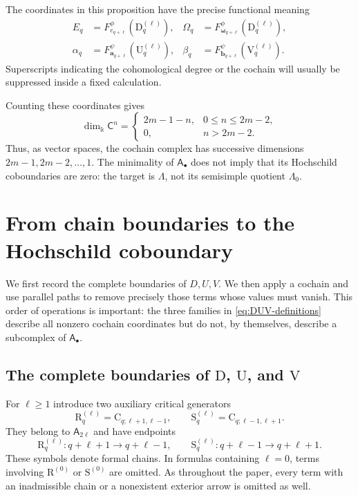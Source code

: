 \documentclass[a4paper,11pt,oneside,reqno]{amsart}
\theoremstyle{definition}
\numberwithin{equation}{section}
\begin{document}
	The coordinates in this proposition have the precise functional meaning
	\begin{equation}\label{eq:coordinate-functionals}
		\begin{aligned}
			E_q&=F_{e_{q+\ell}}^\phi(\mathrm{D}_q^{(\ell)}),&
			\Omega_q&=F_{\boldsymbol{\omega}_{q+\ell}}^\phi(\mathrm{D}_q^{(\ell)}),\\
			\alpha_q&=F_{\mathbf{a}_{q+\ell}}^\psi(\mathrm{U}_q^{(\ell)}),&
			\beta_q&=F_{\mathbf{b}_{q+\ell}}^\psi(\mathrm{V}_q^{(\ell)}).
		\end{aligned}
	\end{equation}
	Superscripts indicating the cohomological degree or the cochain
	will usually be suppressed inside a fixed calculation.
	
	Counting these coordinates gives
	\begin{equation}\label{eq:cochain-dimensions}
		\dim_{\Bbbk}\mathsf C^n=
		\begin{cases}
			2m-1-n,&0\leq n\leq2m-2,\\
			0,&n>2m-2.
		\end{cases}
	\end{equation}
	Thus, as vector spaces, the cochain complex has successive dimensions
	$2m-1,2m-2,\ldots,1$.  The minimality of $\mathsf A_\bullet$ does not imply
	that its Hochschild coboundaries are zero: the target is $\Lambda$,
	not its semisimple quotient $\Lambda_0$.
	
	\section{From chain boundaries to the Hochschild coboundary}
	\label{sec:coboundary}
	
	We first record the complete boundaries of $D,U,V$.  We then apply a
	cochain and use parallel paths to remove precisely those terms whose
	values must vanish.  This order of operations is important: the three
	families in \eqref{eq:DUV-definitions} describe all nonzero cochain
	coordinates but do not, by themselves, describe a subcomplex of
	$\mathsf A_\bullet$.
	
	\subsection{The complete boundaries of \texorpdfstring{$\mathrm{D}$, $\mathrm{U}$, and $\mathrm{V}$}{D, U, and V}}
	
	For $\ell\geq1$ introduce two auxiliary critical generators
	\begin{equation}\label{eq:RS-definitions}
		\mathrm{R}_q^{(\ell)}=\mathrm{C}_{q;\ell+1,\ell-1},\qquad
		\mathrm{S}_q^{(\ell)}=\mathrm{C}_{q;\ell-1,\ell+1}.
	\end{equation}
	They belong to $\mathsf A_{2\ell}$ and have endpoints
	\[
	\mathrm{R}_q^{(\ell)}:q+\ell+1\longrightarrow q+\ell-1,
	\qquad
	\mathrm{S}_q^{(\ell)}:q+\ell-1\longrightarrow q+\ell+1.
	\]
	These symbols denote formal chains. In formulas containing
	$\ell=0$, terms involving $\mathrm{R}^{(0)}$ or $\mathrm{S}^{(0)}$ are omitted.
	As throughout the paper, every term with an inadmissible chain or a
	nonexistent exterior arrow is omitted as well.
	
\end{document}
